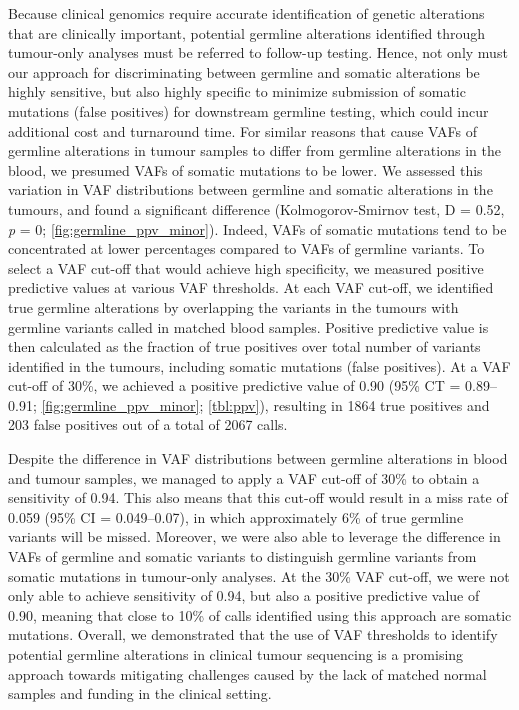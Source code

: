 Because clinical genomics require accurate identification of genetic alterations that are clinically important, potential germline alterations identified through tumour-only analyses must be referred to follow-up testing. Hence, not only must our approach for discriminating between germline and somatic alterations be highly sensitive, but also highly specific to minimize submission of somatic mutations (false positives) for downstream germline testing, which could incur additional cost and turnaround time. For similar reasons that cause VAFs of germline alterations in tumour samples to differ from germline alterations in the blood, we presumed VAFs of somatic mutations to be lower. We assessed this variation in VAF distributions between germline and somatic alterations in the tumours, and found a significant difference (Kolmogorov-Smirnov test, D = 0.52, \textit{p} = 0; \autoref{fig:germline_ppv_minor}). Indeed, VAFs of somatic mutations tend to be concentrated at lower percentages compared to VAFs of germline variants. To select a VAF cut-off that would achieve high specificity, we measured positive predictive values at various VAF thresholds. At each VAF cut-off, we identified true germline alterations by overlapping the variants in the tumours with germline variants called in matched blood samples. Positive predictive value is then calculated as the fraction of true positives over total number of variants identified in the tumours, including somatic mutations (false positives). At a VAF cut-off of 30\%, we achieved a positive predictive value of 0.90 (95\% CT = 0.89--0.91; \autoref{fig:germline_ppv_minor}; \autoref{tbl:ppv}), resulting in 1864 true positives and 203 false positives out of a total of 2067 calls.

Despite the difference in VAF distributions between germline alterations in blood and tumour samples, we managed to apply a VAF cut-off of 30\% to obtain a sensitivity of 0.94. This also means that this cut-off would result in a miss rate of 0.059 (95\% CI = 0.049--0.07), in which approximately 6\% of true germline variants will be missed. Moreover, we were also able to leverage the difference in VAFs of germline and somatic variants to distinguish germline variants from somatic mutations in tumour-only analyses. At the 30\% VAF cut-off, we were not only able to achieve sensitivity of 0.94, but also a positive predictive value of 0.90, meaning that close to 10\% of calls identified using this approach are somatic mutations. Overall, we demonstrated that the use of VAF thresholds to identify potential germline alterations in clinical tumour sequencing is a promising approach towards mitigating challenges caused by the lack of matched normal samples and funding in the clinical setting.

